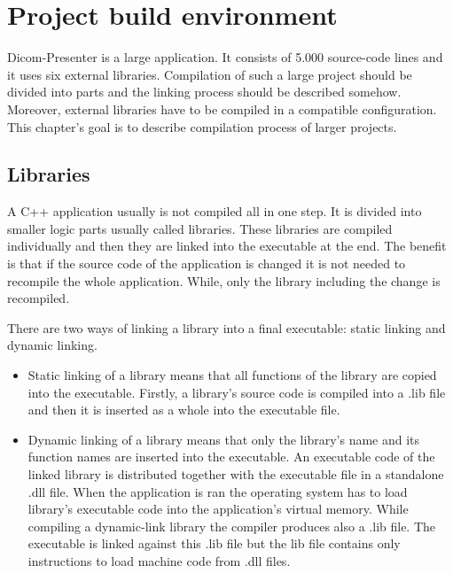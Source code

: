 \chapter{Project build environment}
\vspace{-10mm}

Dicom-Presenter is a large application. It consists of 5.000 source-code lines and it uses six external libraries. Compilation of such a large project should be divided into parts and the linking process should be described somehow. Moreover, external libraries have to be compiled in a compatible configuration. This chapter's goal is to describe compilation process of larger projects.

\section{Libraries}

\label{library}

A C++ application usually is not compiled all in one step. It is divided into smaller logic parts usually called libraries. These libraries are compiled individually and then they are linked into the executable at the end. The benefit is that if the source code of the application is changed it is not needed to recompile the whole application. While, only the library including the change is recompiled. 

There are two ways of linking a library into a final executable: static linking and dynamic linking.
\begin{itemize}
\item Static linking of a library means that all functions of the library are copied into the executable. Firstly, a library's source code is compiled into a .lib file and then it is inserted as a whole into the executable file.
\item Dynamic linking of a library means that only the library's name and its function names are inserted into the executable. An executable code of the linked library is distributed together with the executable file in a standalone .dll file. When the application is ran the operating system has to load library's executable code into the application's virtual memory. While compiling a dynamic-link library the compiler produces also a .lib file. The executable is linked against this .lib file but the lib file contains only instructions to load machine code from .dll files.
\end{itemize}



